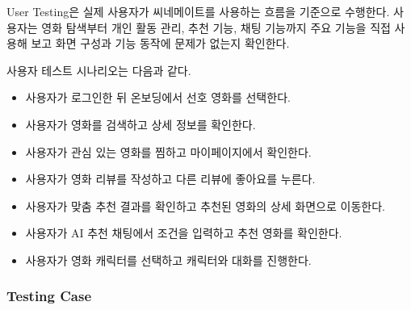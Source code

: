 \documentclass[11pt,a4paper]{article}
\providecommand{\tightlist}{%
  \setlength{\itemsep}{0.25em}\setlength{\parskip}{0.1em}}
\begin{document}
User Testing은 실제 사용자가 씨네메이트를 사용하는 흐름을 기준으로 수행한다. 사용자는 영화 탐색부터 개인 활동 관리, 추천 기능, 채팅 기능까지 주요 기능을 직접 사용해 보고 화면 구성과 기능 동작에 문제가 없는지 확인한다.

사용자 테스트 시나리오는 다음과 같다.

\begin{itemize}
\tightlist
\item
  사용자가 로그인한 뒤 온보딩에서 선호 영화를 선택한다.
\item
  사용자가 영화를 검색하고 상세 정보를 확인한다.
\item
  사용자가 관심 있는 영화를 찜하고 마이페이지에서 확인한다.
\item
  사용자가 영화 리뷰를 작성하고 다른 리뷰에 좋아요를 누른다.
\item
  사용자가 맞춤 추천 결과를 확인하고 추천된 영화의 상세 화면으로 이동한다.
\item
  사용자가 AI 추천 채팅에서 조건을 입력하고 추천 영화를 확인한다.
\item
  사용자가 영화 캐릭터를 선택하고 캐릭터와 대화를 진행한다.
\end{itemize}

\hypertarget{testing-case}{%
\subsubsection{Testing Case}\label{testing-case}}
\end{document}
